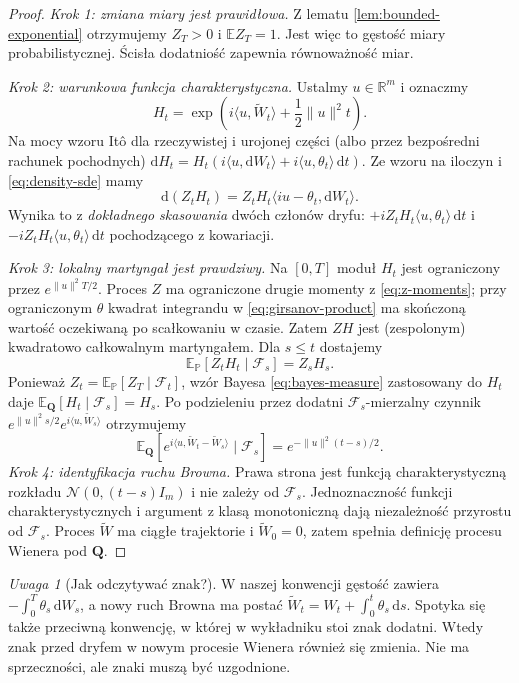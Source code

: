 \documentclass[11pt,a4paper,oneside]{report}
\numberwithin{equation}{chapter}
\theoremstyle{plain}
\theoremstyle{definition}
\theoremstyle{remark}
\newtheorem{uwaga}{Uwaga}[chapter]
\newcommand{\R}{\mathbb{R}}
\newcommand{\Prob}{\mathbb{P}}
\newcommand{\E}{\mathbb{E}}
\newcommand{\calF}{\mathcal{F}}
\newcommand{\dd}{\mathrm{d}}
\newcommand{\norm}[1]{\lVert #1\rVert}
\newcommand{\Normal}{\mathcal{N}}
\begin{document}
\begin{proof}
\emph{Krok 1: zmiana miary jest prawidłowa.}
Z lematu \ref{lem:bounded-exponential} otrzymujemy
$Z_T>0$ i $\E Z_T=1$. Jest więc to gęstość miary
probabilistycznej. Ścisła dodatniość zapewnia
równoważność miar.

\emph{Krok 2: warunkowa funkcja charakterystyczna.}
Ustalmy $u\in\R^m$ i oznaczmy
\[
H_t=\exp\left(i\langle u,\widetilde W_t\rangle
                    +\frac12\norm u^2t\right).
\]
Na mocy wzoru Itô dla rzeczywistej i urojonej
części (albo przez bezpośredni rachunek pochodnych)
$\dd H_t=H_t(i\langle u,\dd W_t\rangle
+i\langle u,\theta_t\rangle\,\dd t)$.
Ze wzoru na iloczyn i \eqref{eq:density-sde} mamy
\[
\dd(Z_tH_t)=Z_tH_t\langle iu-\theta_t,\dd W_t\rangle.
\tag{8.6}\label{eq:girsanov-product}
\]
Wynika to z \emph{dokładnego skasowania} dwóch
członów dryfu: $+iZ_tH_t\langle u,\theta_t\rangle\,\dd t$
i $-iZ_tH_t\langle u,\theta_t\rangle\,\dd t$
pochodzącego z kowariacji.

\emph{Krok 3: lokalny martyngał jest prawdziwy.}
Na $[0,T]$ moduł $H_t$ jest ograniczony przez
$e^{\norm u^2T/2}$. Proces $Z$ ma ograniczone
drugie momenty z \eqref{eq:z-moments}; przy
ograniczonym $\theta$ kwadrat integrandu w
\eqref{eq:girsanov-product} ma skończoną wartość
oczekiwaną po scałkowaniu w czasie. Zatem $ZH$
jest (zespolonym) kwadratowo całkowalnym martyngałem.
Dla $s\le t$ dostajemy
\[
\E_{\Prob}[Z_tH_t\mid\calF_s]=Z_sH_s.
\]
Ponieważ $Z_t=\E_{\Prob}[Z_T\mid\calF_t]$,
wzór Bayesa \eqref{eq:bayes-measure} zastosowany do
$H_t$ daje $\E_{\mathbf Q}[H_t\mid\calF_s]=H_s$.
Po podzieleniu przez dodatni $\calF_s$-mierzalny
czynnik $e^{\norm u^2s/2}e^{i\langle u,\widetilde W_s\rangle}$
otrzymujemy
\[
\E_{\mathbf Q}[e^{i\langle u,\widetilde W_t-\widetilde W_s\rangle}
\mid\calF_s]
=e^{-\norm u^2(t-s)/2}.
\tag{8.7}\label{eq:girsanov-char}
\]
\emph{Krok 4: identyfikacja ruchu Browna.}
Prawa strona jest funkcją charakterystyczną rozkładu
$\Normal(0,(t-s)I_m)$ i nie zależy od $\calF_s$.
Jednoznaczność funkcji charakterystycznych i
argument z klasą monotoniczną dają niezależność
przyrostu od $\calF_s$. Proces $\widetilde W$ ma
ciągłe trajektorie i $\widetilde W_0=0$, zatem
spełnia definicję procesu Wienera pod $\mathbf Q$.
\end{proof}

\begin{uwaga}[Jak odczytywać znak?]
W naszej konwencji gęstość zawiera
$-\int_0^T\theta_s\,\dd W_s$, a nowy ruch Browna ma postać
$\widetilde W_t=W_t+\int_0^t\theta_s\,\dd s$.
Spotyka się także przeciwną konwencję, w której
w wykładniku stoi znak dodatni. Wtedy znak przed
dryfem w nowym procesie Wienera również się zmienia.
Nie ma sprzeczności, ale znaki muszą być uzgodnione.
\end{uwaga}
\end{document}

